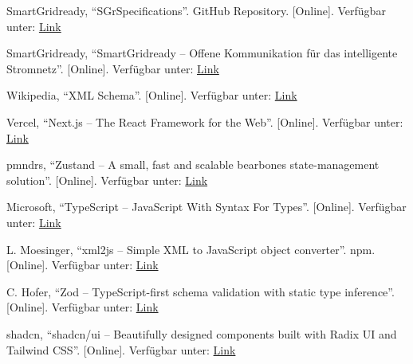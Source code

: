 \documentclass[a4paper,12pt]{article}
\begin{document}
\begin{enumerate}[label={[\arabic*]}]
    \item SmartGridready, ``SGrSpecifications''. GitHub Repository. [Online]. Verfügbar unter: 
          \href{https://github.com/SmartGridready/SGrSpecifications}{Link}
    
    \item SmartGridready, ``SmartGridready -- Offene Kommunikation für das intelligente Stromnetz''. 
          [Online]. Verfügbar unter: \href{https://smartgridready.ch/}{Link}
    
    \item Wikipedia, ``XML Schema''. [Online]. Verfügbar unter: 
          \href{https://de.wikipedia.org/wiki/XML_Schema}{Link}
    
    \item Vercel, ``Next.js -- The React Framework for the Web''. [Online]. Verfügbar unter: 
          \href{https://nextjs.org/}{Link}
    
    \item pmndrs, ``Zustand -- A small, fast and scalable bearbones state-management solution''. 
          [Online]. Verfügbar unter: \href{https://github.com/pmndrs/zustand}{Link}
    
    \item Microsoft, ``TypeScript -- JavaScript With Syntax For Types''. [Online]. Verfügbar unter: 
          \href{https://www.typescriptlang.org/}{Link}
    
    \item L. Moesinger, ``xml2js -- Simple XML to JavaScript object converter''. npm. [Online]. 
          Verfügbar unter: \href{https://www.npmjs.com/package/xml2js}{Link}
    
    \item C. Hofer, ``Zod -- TypeScript-first schema validation with static type inference''. 
          [Online]. Verfügbar unter: \href{https://zod.dev/}{Link}
    
    \item shadcn, ``shadcn/ui -- Beautifully designed components built with Radix UI and Tailwind CSS''. 
          [Online]. Verfügbar unter: \href{https://ui.shadcn.com/}{Link}
\end{enumerate}

\newpage
\appendix

\renewcommand{\thesubsection}{\thesection\arabic{subsection}}
\end{document}
